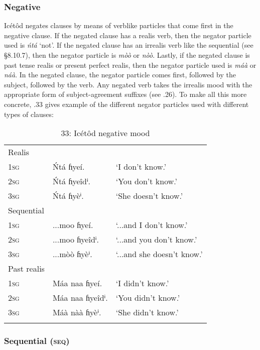 \subsubsection{Negative}

Icétôd negates clauses by means of verblike particles that come first in the negative clause. If the negated clause has a realis verb, then the negator particle used is \textit{ńtá} ‘not’. If the negated clause has an irrealis verb like the sequential (see §8.10.7), then the negator particle is \textit{mòò} or \textit{nòò}. Lastly, if the negated clause is past tense realis or present perfect realis, then the negator particle used is \textit{máà} or \textit{náà}. In the negated clause, the negator particle comes first, followed by the subject, followed by the verb. Any negated verb takes the irrealis mood with the appropriate form of subject-agreement suffixes (see .26). To make all this more concrete, .33 gives example of the different negator particles used with different types of clauses:


\begin{table}
\caption{33: Icétôd negative mood}
\label{tab:8}


\begin{tabularx}{\textwidth}{XXX}
\lsptoprule

Realis &  & \\
\textsc{1sg} & \'{N}tá ɦyeí. & ‘I don’t know.’\\
\textsc{2sg} & \'{N}tá ɦyeîdⁱ. & ‘You don’t know.’\\
\textsc{3sg} & \'{N}tá ɦyèⁱ. & ‘She doesn’t know.’\\
Sequential &  & \\
\textsc{1sg} & ...moo ɦyeí. & ‘...and I don’t know.’\\
\textsc{2sg} & ...moo ɦyeîdⁱ. & ‘...and you don’t know.’\\
\textsc{3sg} & ...mòò ɦyèⁱ. & ‘...and she doesn’t know.’\\
Past realis &  & \\
\textsc{1sg} & Máa naa ɦyeí. & ‘I didn’t know.’\\
\textsc{2sg} & Máa naa ɦyeîdⁱ. & ‘You didn’t know.’\\
\textsc{3sg} & Máà nàà ɦyèⁱ. & ‘She didn’t know.’\\
\lspbottomrule
\end{tabularx}
\end{table}

\subsubsection{Sequential (\textsc{seq})}

